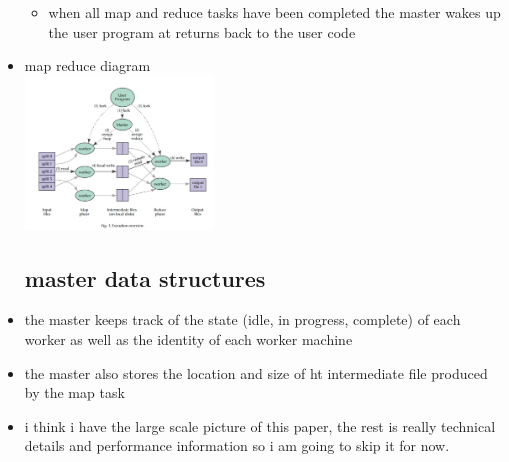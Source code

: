 \documentclass{article}
\begin{document}
\begin{itemize}
\begin{itemize}
    \item when all map and reduce tasks have been completed the master wakes up the user program at returns back to the user code 
\end{itemize}
\item map reduce diagram \\\includegraphics[width=5cm]{reading assignment notes/week 2/MapReduce: Simplified Data Processing on Large Clusters/images/mw_2.jpg} 

\subsection{master data structures}
\item the master keeps track of the state (idle, in progress, complete) of each worker as well as the identity of each worker machine 
\item the master also stores the location and size of ht intermediate file produced by the map task
\item i think i have the large scale picture of this paper, the rest is really technical details and performance information so i am going to skip it for now. 

\end{itemize}
\end{document}
